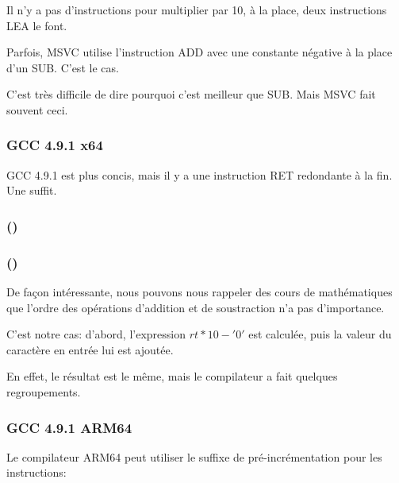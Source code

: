 Il n'y a pas d'instructions pour multiplier par 10, à la place, deux instructions
LEA le font.

Parfois, MSVC utilise l'instruction ADD avec une constante négative à la place d'un SUB.
C'est le cas.

C'est très difficile de dire pourquoi c'est meilleur que SUB.
Mais MSVC fait souvent ceci.

\subsubsection{GCC 4.9.1 x64 \Optimizing}

GCC 4.9.1 \Optimizing est plus concis, mais il y a une instruction RET redondante
à la fin.
Une suffit.



\subsubsection{\OptimizingKeilVI (\ARMMode)}



\subsubsection{\OptimizingKeilVI (\ThumbMode)}



De façon intéressante, nous pouvons nous rappeler des cours de mathématiques que
l'ordre des opérations d'addition et de soustraction n'a pas d'importance.

C'est notre cas: d'abord, l'expression $rt*10 - '0'$ est calculée, puis la valeur
du caractère en entrée lui est ajoutée.

En effet, le résultat est le même, mais le compilateur a fait quelques regroupements.

\subsubsection{GCC 4.9.1 ARM64 \Optimizing}

Le compilateur ARM64 peut utiliser le suffixe de pré-incrémentation pour les instructions:

